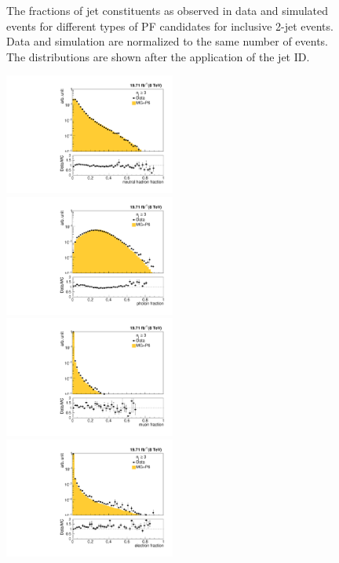 \begin{figure}[!htbp]
\begin{center}
    \caption{The fractions of jet constituents as observed in data and simulated events for different types of PF candidates for inclusive 2-jet events. Data and simulation are normalized to the same number of events. The distributions are shown after the application of the jet ID.}
    \label{fig:qual2}
  \end{center}
\end{figure} 

\begin{figure}[!htbp]
  \begin{center}
    \includegraphics[width=0.5\textwidth]{Plots_HT_2_150/Qual/Comparison_NuHadFrac_3_HT_2_150.pdf}%
    \includegraphics[width=0.5\textwidth]{Plots_HT_2_150/Qual/Comparison_PhFrac_3_HT_2_150.pdf}\\
    \includegraphics[width=0.5\textwidth]{Plots_HT_2_150/Qual/Comparison_MuFrac_3_HT_2_150.pdf}%
    \includegraphics[width=0.5\textwidth]{Plots_HT_2_150/Qual/Comparison_ElFrac_3_HT_2_150.pdf}\\

\end{center}
\end{figure}

